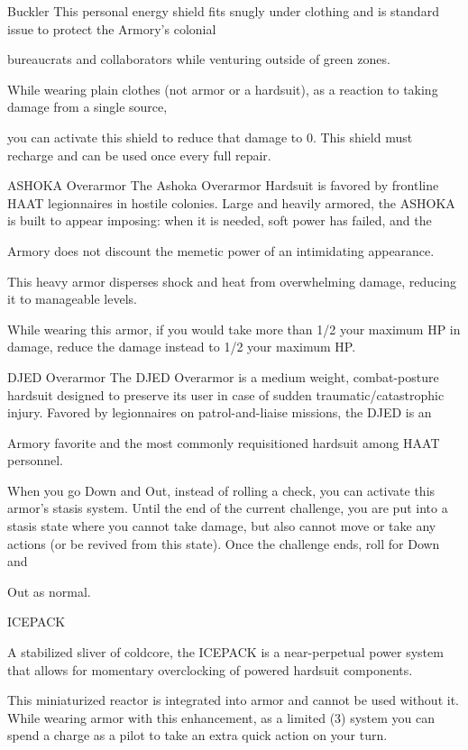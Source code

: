 Buckler
This personal energy shield fits snugly under clothing and is standard issue to protect the Armory’s colonial

bureaucrats and collaborators while venturing outside of green zones.

While wearing plain clothes (not armor or a hardsuit), as a reaction to taking damage from a single source,

you can activate this shield to reduce that damage to 0. This shield must recharge and can be used once
every full repair.


ASHOKA Overarmor
The Ashoka Overarmor Hardsuit is favored by frontline HAAT legionnaires in hostile colonies. Large and
heavily armored, the ASHOKA is built to appear imposing: when it is needed, soft power has failed, and the

Armory does not discount the memetic power of an intimidating appearance.

This heavy armor disperses shock and heat from overwhelming damage, reducing it to manageable levels.

While wearing this armor, if you would take more than 1/2 your maximum HP in damage, reduce the
damage instead to 1/2 your maximum HP.


DJED Overarmor
The DJED Overarmor is a medium weight, combat-posture hardsuit designed to preserve its user in case of
sudden traumatic/catastrophic injury. Favored by legionnaires on patrol-and-liaise missions, the DJED is an

Armory favorite and the most commonly requisitioned hardsuit among HAAT personnel.




When you go Down and Out, instead of rolling a check, you can activate this armor’s stasis system. Until
the end of the current challenge, you are put into a stasis state where you cannot take damage, but also
cannot move or take any actions (or be revived from this state). Once the challenge ends, roll for Down and

Out as normal.


ICEPACK

A stabilized sliver of coldcore, the ICEPACK is a near-perpetual power system that allows for momentary
overclocking of powered hardsuit components.

This miniaturized reactor is integrated into armor and cannot be used without it. While wearing armor with
this enhancement, as a limited (3) system you can spend a charge as a pilot to take an extra quick action
on your turn.


